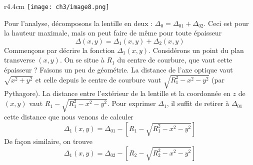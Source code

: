 	\begin{wrapfigure}[9]{r}{4.4cm}
	\vspace{-5mm}
	\texttt{[image: ch3/image8.png]}
	\end{wrapfigure}
	Pour l'analyse, décomposons la lentille en deux : $\Delta_0 = \Delta_{01}+\Delta_{02}$. Ceci est 
	pour la hauteur maximale, mais on peut faire de même pour toute épaisseur
	\begin{equation}
	\Delta (x,y) = \Delta_1(x,y) + \Delta_2(x,y)
	\end{equation}
	Commençons par décrire la fonction $\Delta_1(x,y)$. Considérons un point du plan transverse $(x,y)$. 
	On se situe à $R_1$ du centre de courbure, que vaut cette épaisseur ? Faisons un peu de géométrie. 
	La distance de l'axe optique vaut $\sqrt{x^2+y^2}$ et celle depuis le centre de courbure vaut 
	$\sqrt{R_1^2-x^2-y^2}$ (par Pythagore). La distance entre l'extérieur de la lentille et la 
	coordonnée en $z$ de $(x,y)$ vaut $R_1-\sqrt{R_1^2-x^2-y^2}$. Pour exprimer $\Delta_1$, il suffit 
	de retirer à $\Delta_{01}$ cette distance que nous venons de calculer
	\begin{equation}
	\Delta_1(x,y) = \Delta_{01}-\left[ R_1-\sqrt{R_1^2-x^2-y^2}\right]
	\end{equation}
	De façon similaire, on trouve
	\begin{equation}
	\Delta_1(x,y) = \Delta_{02}-\left[ R_2-\sqrt{R_2^2-x^2-y^2}\right]	
	\end{equation}

